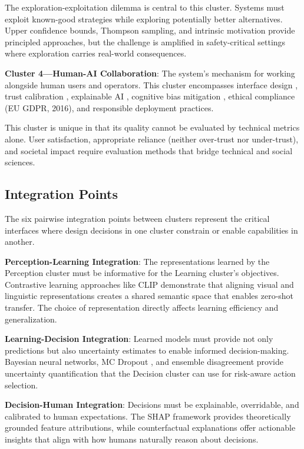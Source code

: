 \documentclass[11pt,a4paper]{article}
\begin{document}
The exploration-exploitation dilemma \citep{sutton2018} is central to this cluster. Systems must exploit known-good strategies while exploring potentially better alternatives. Upper confidence bounds, Thompson sampling, and intrinsic motivation provide principled approaches, but the challenge is amplified in safety-critical settings where exploration carries real-world consequences.

\textbf{Cluster 4---Human-AI Collaboration}: The system's mechanism for working alongside human users and operators. This cluster encompasses interface design \citep{norman2013}, trust calibration \citep{lee2004}, explainable AI \citep{ribeiro2016,lundberg2017}, cognitive bias mitigation \citep{kahneman2011}, ethical compliance (EU GDPR, 2016), and responsible deployment practices.

This cluster is unique in that its quality cannot be evaluated by technical metrics alone. User satisfaction, appropriate reliance (neither over-trust nor under-trust), and societal impact require evaluation methods that bridge technical and social sciences.

\subsection{Integration Points}

The six pairwise integration points between clusters represent the critical interfaces where design decisions in one cluster constrain or enable capabilities in another.

\textbf{Perception-Learning Integration}: The representations learned by the Perception cluster must be informative for the Learning cluster's objectives. Contrastive learning approaches like CLIP \citep{radford2021} demonstrate that aligning visual and linguistic representations creates a shared semantic space that enables zero-shot transfer. The choice of representation directly affects learning efficiency and generalization.

\textbf{Learning-Decision Integration}: Learned models must provide not only predictions but also uncertainty estimates to enable informed decision-making. Bayesian neural networks, MC Dropout \citep{gal2016}, and ensemble disagreement provide uncertainty quantification that the Decision cluster can use for risk-aware action selection.

\textbf{Decision-Human Integration}: Decisions must be explainable, overridable, and calibrated to human expectations. The SHAP framework \citep{lundberg2017} provides theoretically grounded feature attributions, while counterfactual explanations \citep{wachter2017} offer actionable insights that align with how humans naturally reason about decisions.
\end{document}
